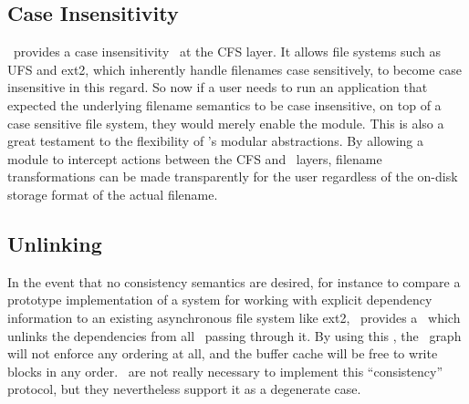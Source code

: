


\subsection{Case Insensitivity}
\label{sec:modules:icase}
\Kudos\ provides a case insensitivity \module\ at the CFS layer. It
allows file systems such as UFS and ext2, which inherently handle filenames
case sensitively, to become case insensitive in this regard. So now if a user
needs to run an application that expected the underlying filename semantics
to be case insensitive, on top of a case sensitive file system, they would
merely enable the module. This is also a great testament to the flexibility
of \Kudos's modular abstractions. By allowing a module to intercept actions
between the CFS and \LFS\ layers, filename transformations can be made
transparently for the user regardless of the on-disk storage format of
the actual filename.

\subsection{\ChDesc Unlinking}
\label{sec:modules:unlink}
In the event that no consistency semantics are desired, for instance to compare
a prototype implementation of a system for working with explicit dependency
information to an existing asynchronous file system like ext2, \Kudos\ provides
a \module\ which unlinks the dependencies from all \chdescs\ passing through it.
By using this \module, the \chdesc\ graph will not enforce any ordering at all,
and the buffer cache will be free to write blocks in any order. \Chdescs\ are
not really necessary to implement this ``consistency'' protocol, but they
nevertheless support it as a degenerate case.

